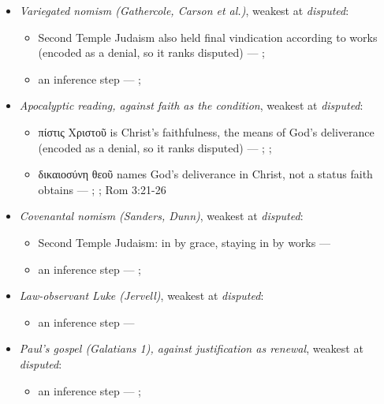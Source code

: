 \documentclass[11pt]{article}
\begin{document}
\begin{itemize}
\begin{itemize}
\item an inference step --- \cite[Trent, Session VI (1547), canon 9]{tanner-decrees-1990}
\end{itemize}
\item \emph{Variegated nomism (Gathercole, Carson et al.)}, weakest at \emph{disputed}:
\begin{itemize}
\item Second Temple Judaism also held final vindication according to works (encoded as a denial, so it ranks disputed) --- \cite{gathercole-where-boasting-2002}; \cite{carson-variegated-nomism-1-2001}
\item an inference step --- \cite{gathercole-where-boasting-2002}; \cite{carson-variegated-nomism-1-2001}
\end{itemize}
\item \emph{Apocalyptic reading, against faith as the condition}, weakest at \emph{disputed}:
\begin{itemize}
\item πίστις Χριστοῦ is Christ's faithfulness, the means of God's deliverance (encoded as a denial, so it ranks disputed) --- \cite{campbell-deliverance-god-2009}; \cite[ad loc. Gal 2:16]{martyn-galatians-1997}; \cite{hays-faith-jesus-christ-2002}
\item δικαιοσύνη θεοῦ names God's deliverance in Christ, not a status faith obtains --- \cite{campbell-deliverance-god-2009}; \cite{martyn-galatians-1997}; Rom 3:21-26
\end{itemize}
\item \emph{Covenantal nomism (Sanders, Dunn)}, weakest at \emph{disputed}:
\begin{itemize}
\item Second Temple Judaism: in by grace, staying in by works --- \cite{sanders-paul-palestinian-judaism-1977}
\item an inference step --- \cite{dunn-new-perspective-2005}; \cite{wright-what-paul-said-1997}
\end{itemize}
\item \emph{Law-observant Luke (Jervell)}, weakest at \emph{disputed}:
\begin{itemize}
\item an inference step --- \cite{jervell-luke-people-god-1972}
\end{itemize}
\item \emph{Paul's gospel (Galatians 1), against justification as renewal}, weakest at \emph{disputed}:
\begin{itemize}
\item an inference step --- \cite[ad loc. Gal 1:6]{moo-galatians-2013}; \cite[XI.1]{westminster-confession-1647}

\end{itemize}
\end{itemize}
\end{document}
